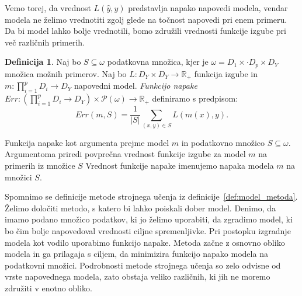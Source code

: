 \documentclass[12pt,a4paper,twoside]{article}
\theoremstyle{definition} %
\newtheorem{definicija}{Definicija}[section]
\theoremstyle{plain} %
\numberwithin{equation}{section}  %
\begin{document}
Vemo torej, da vrednost $L(\hat{y}, y)$ predstavlja napako napovedi modela, vendar modela ne želimo vrednotiti zgolj glede na točnost napovedi pri enem primeru. 
Da bi model lahko bolje vrednotili, bomo združili vrednosti funkcije izgube pri več različnih primerih.

\begin{definicija}
\label{def-funkcija-napake}
	Naj bo $S \subseteq \omega$ podatkovna množica, kjer je $\omega = D_1 \times \cdot D_p \times D_Y$ množica možnih primerov.
	Naj bo $L: D_Y \times D_Y \rightarrow \mathbb{R}_+$ funkcija izgube in $m: \prod_{i=1}^p D_i \rightarrow D_Y$ napovedni model. 
	\emph{Funkcijo napake} $Err: (\prod_{i=1}^p D_i \rightarrow D_Y) \times \mathcal P (\omega) \rightarrow \mathbb{R}_+$ definiramo s predpisom:
	\[
	Err(m,S) = \frac{1}{|S|} \sum_{(x,y) \in S} L(m(x),y).
	\]
\end{definicija}

Funkcija napake kot argumenta prejme model $m$ in podatkovno množico $S \subseteq \omega$.
Argumentoma priredi povprečna vrednost funkcije izgube za model $m$ na primerih iz množice $S$
Vrednost funkcije napake imenujemo napaka modela $m$ na množici $S$.





Spomnimo se definicije metode strojnega učenja iz definicije~\ref{def:model_metoda}.
Želimo določiti metodo, s katero bi lahko poiskali dober model.
Denimo, da imamo podano množico podatkov, ki jo želimo uporabiti, da zgradimo model, ki bo čim bolje napovedoval vrednosti ciljne spremenljivke.
Pri postopku izgradnje modela kot vodilo uporabimo funkcijo napake.
Metoda začne z osnovno obliko modela in ga prilagaja s ciljem, da minimizira funkcijo napako modela na podatkovni množici.
Podrobnosti metode strojnega učenja so zelo odvisne od vrste napovednega modela, zato obstaja veliko različnih, ki jih ne moremo združiti v enotno obliko.
\end{document}
